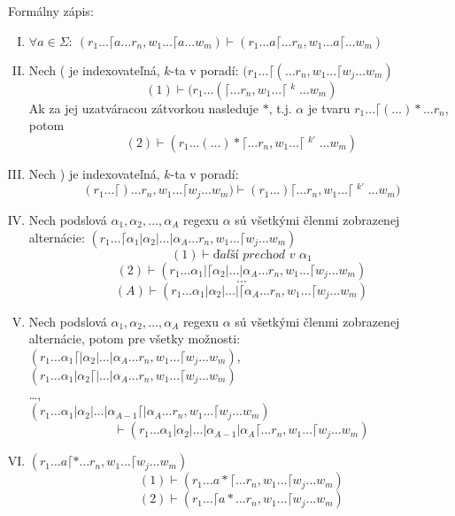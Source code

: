 \begin{df}
Formálny zápis:
\begin{enumerate}[I.]\label{dfkonfig}
\item $\forall a \in \Sigma: ~(r_1 \dots \lceil a \dots r_n, w_1 \dots \lceil a \dots w_m) \vdash (r_1 \dots a\lceil \dots r_n, w_1 \dots a \lceil \dots w_m)$
\item Nech ( je indexovateľná, $k$-ta v poradí: $\displaystyle{ (r_1 \dots \lceil ( \dots r_n, w_1 \dots \lceil w_j \dots w_m)}$ $$(1) \vdash (r_1 \dots (\lceil \dots r_n, w_1 \dots \lceil \mathop{w_j}^k \dots w_m)$$
Ak za jej uzatváracou zátvorkou nasleduje $*$, t.j. $\alpha$ je tvaru $r_1 \dots \lceil ( \dots ) * \dots r_n$, potom $$ (2) \vdash (r_1 \dots (\dots )* \lceil \dots r_n, w_1 \dots \lceil \mathop{\mathop{w_j}^k}^{k'} \dots w_m ) $$
\item Nech ) je indexovateľná, $k$-ta v poradí: $$ (r_1 \dots \lceil ) \dots r_n, w_1 \dots \lceil w_j \dots w_m) \vdash (r_1 \dots )\lceil \dots r_n, w_1 \dots \lceil \mathop{w_j}^{k'} \dots w_m)$$
\item Nech podslová $\alpha_1, \alpha_2,\dots,\alpha_A$ regexu $\alpha$ sú všetkými členmi zobrazenej alternácie: $(r_1 \dots \lceil \alpha_1 | \alpha_2 | \dots | \alpha_A \dots r_n, w_1\dots \lceil w_j \dots w_m)$
$$(1) \vdash \textit{ďalší prechod v }\alpha_1$$
$$(2) \vdash (r_1 \dots \alpha_1 | \lceil \alpha_2 | \dots | \alpha_A \dots r_n, w_1\dots \lceil w_j \dots w_m)$$
$$\dots$$
$$(A) \vdash (r_1 \dots \alpha_1 | \alpha_2 | \dots | \lceil \alpha_A \dots r_n, w_1\dots \lceil w_j \dots w_m)$$
\item Nech podslová $\alpha_1, \alpha_2,\dots,\alpha_A$ regexu $\alpha$ sú všetkými členmi zobrazenej alternácie, potom pre všetky možnosti:
\\ $(r_1 \dots \alpha_1 \lceil | \alpha_2 | \dots | \alpha_A \dots r_n, w_1\dots \lceil w_j \dots w_m)$,
\\ $(r_1 \dots \alpha_1 | \alpha_2 \lceil | \dots | \alpha_A \dots r_n, w_1\dots \lceil w_j \dots w_m)$
\\ \dots, \\ $(r_1 \dots \alpha_1 | \alpha_2 | \dots | \alpha_{A-1} \lceil | \alpha_A \dots r_n, w_1\dots \lceil w_j \dots w_m)$
$$\vdash (r_1 \dots \alpha_1 | \alpha_2 | \dots | \alpha_{A-1} | \alpha_A \lceil \dots r_n, w_1\dots \lceil w_j \dots w_m)$$
\item $(r_1\dots a\lceil *\dots r_n, w_1\dots\lceil w_j\dots w_m)$
$$(1) \vdash (r_1\dots a *\lceil\dots r_n, w_1\dots\lceil w_j\dots w_m)$$
$$(2) \vdash (r_1\dots \lceil a *\dots r_n, w_1\dots\lceil w_j\dots w_m)$$

\end{enumerate}
\end{df}

